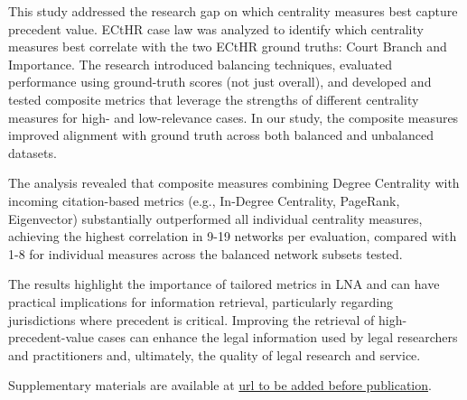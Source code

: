 \documentclass[sigconf,authordraft]{acmart}
\begin{document}
This study addressed the research gap on which centrality measures best capture precedent value. ECtHR case law was analyzed to identify which centrality measures best correlate with the two ECtHR ground truths: Court Branch and Importance.
The research introduced balancing techniques, evaluated performance using ground-truth scores (not just overall), and developed and tested composite metrics that leverage the strengths of different centrality measures for high- and low-relevance cases. In our study, the composite measures improved alignment with ground truth across both balanced and unbalanced datasets.

The analysis revealed that composite measures combining Degree Centrality with incoming citation-based metrics (e.g., In-Degree Centrality, PageRank, Eigenvector) substantially outperformed all individual centrality measures, achieving the highest correlation in 9-19 networks per evaluation, compared with 1-8 for individual measures across the balanced network subsets tested.

The results highlight the importance of tailored metrics in LNA and can have practical implications for information retrieval, particularly regarding jurisdictions where precedent is critical. Improving the retrieval of high-precedent-value cases can enhance the legal information used by legal researchers and practitioners and, ultimately, the quality of legal research and service.

Supplementary materials are available at \url{url to be added before publication}.






\end{document}
